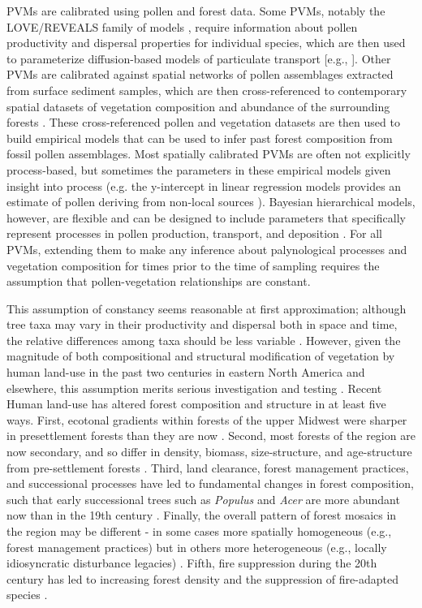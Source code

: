 \documentclass[12pt]{article}
\begin{document}
PVMs are calibrated using pollen and forest data. Some PVMs, notably
the LOVE/REVEALS family of models \citep{sugita2007theory1,
  sugita2007theory2}, require information about pollen productivity
and dispersal properties for individual species, which are then used
to parameterize diffusion-based models of particulate transport [e.g.,
\citet{prentice1985pollen}]. Other PVMs are calibrated against spatial
networks of pollen assemblages extracted from surface sediment
samples, which are then cross-referenced to contemporary spatial
datasets of vegetation composition and abundance of the surrounding
forests \citep{XXX}. These cross-referenced pollen and vegetation
datasets are then used to build empirical models that can be used to
infer past forest composition from fossil pollen assemblages. Most
spatially calibrated PVMs are often not explicitly process-based, but
sometimes the parameters in these empirical models given insight into
process (e.g. the y-intercept in linear regression models provides an
estimate of pollen deriving from non-local sources
\citep{howe1983calibrating}).  Bayesian hierarchical models, however,
are flexible and can be designed to include parameters that
specifically represent processes in pollen production, transport, and
deposition \citep{paciorek2009mapping}.  For all PVMs, extending them
to make any inference about palynological processes and vegetation
composition for times prior to the time of sampling requires the
assumption that pollen-vegetation relationships are constant.

This assumption of constancy seems reasonable at first approximation;
although tree taxa may vary in their productivity and dispersal both
in space and time, the relative differences among taxa should be less
variable \citep{parsons1981statistical}.  However, given the magnitude
of both compositional and structural modification of vegetation by
human land-use in the past two centuries in eastern North America and
elsewhere, this assumption merits serious investigation and testing
\citep{kujawa2015}. Recent Human land-use has altered forest
composition and structure in at least five ways.  First, ecotonal
gradients within forests of the upper Midwest were sharper in
presettlement forests than they are now
\citep{goring_witness}. Second, most forests of the region are now
secondary, and so differ in density, biomass, size-structure, and
age-structure from pre-settlement forests
\citep{rhemtulla2009legacies}.  Third, land clearance, forest
management practices, and successional processes have led to
fundamental changes in forest composition, such that early
successional trees such as \textit{Populus} and \textit{Acer} are more
abundant now than in the 19th century \citep{XXX}.  Finally, the
overall pattern of forest mosaics in the region may be different - in
some cases more spatially homogeneous (e.g., forest management
practices) but in others more heterogeneous (e.g., locally
idiosyncratic disturbance legacies) \citep{XXX}. Fifth, fire
suppression during the 20th century has led to increasing forest
density and the suppression of fire-adapted species
\citep{nowacki2008demise}.
\end{document}

